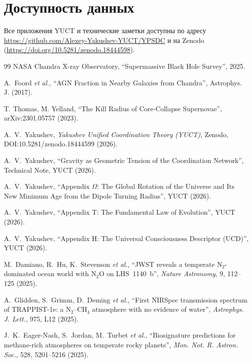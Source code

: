 \documentclass[11pt,a4paper]{article}
\begin{document}
	\section*{Доступность данных}
	Все приложения YUCT и технические заметки доступны по адресу \url{https://github.com/Alexey-Yakushev-YUCT/YPSDC} и на Zenodo (\url{https://doi.org/10.5281/zenodo.18444598}).
	
	
	\begin{thebibliography}{99}
		NASA Chandra X-ray Observatory, ``Supermassive Black Hole Survey'', 2025.
		
		A.~Foord \emph{et al.}, ``AGN Fraction in Nearby Galaxies from Chandra'',
		Astrophys. J. (2017).
		
		T. Thomas, M. Yelland, ``The Kill Radius of Core-Collapse Supernovae'',
		arXiv:2301.05757 (2023).
		
		A.~V.~Yakushev, \emph{Yakushev Unified Coordination Theory (YUCT)},
		Zenodo, DOI:10.5281/zenodo.18444599 (2026).
		
		A.~V.~Yakushev, ``Gravity as Geometric Tension of the Coordination
		Network'', Technical Note, YUCT (2026).
		
		A.~V.~Yakushev, ``Appendix $\Omega$: The Global Rotation of the
		Universe and Its New Minimum Age from the Dipole Turning Radius'',
		YUCT (2026).
		
		A.~V.~Yakushev, ``Appendix T: The Fundamental Law of Evolution'',
		YUCT (2026).
		
		A.~V.~Yakushev, ``Appendix H: The Universal Consciousness Descriptor
		(UCD)'', YUCT (2026).
		
		M.~Damiano, R.~Hu, K.~Stevenson \emph{et al.},
		``JWST reveals a temperate N$_2$-dominated ocean world with N$_2$O
		on LHS~1140~b'', \emph{Nature Astronomy}, 9, 112--125 (2025).
		
		A.~Glidden, S.~Grimm, D.~Deming \emph{et al.},
		``First NIRSpec transmission spectrum of TRAPPIST-1e: a N$_2$--CH$_4$
		atmosphere with no evidence of water'', \emph{Astrophys. J. Lett.},
		975, L12 (2025).
		
		J.~K.~Eager-Nash, S.~Jordan, M.~Turbet \emph{et al.},
		``Biosignature predictions for methane-rich atmospheres on temperate
		rocky planets'', \emph{Mon. Not. R. Astron. Soc.}, 528, 5201--5216
		(2025).
	\end{thebibliography}
	
\end{document}

